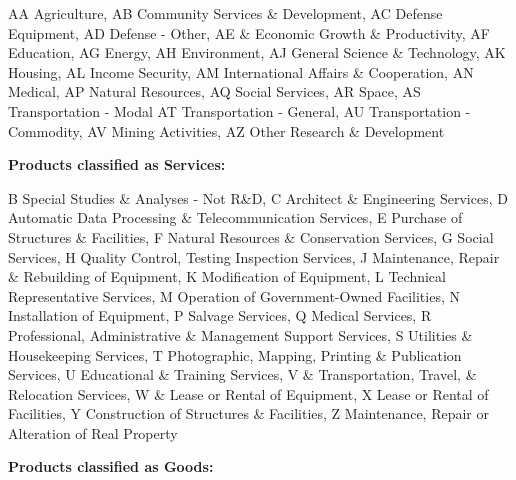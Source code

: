 \documentclass[dv_diss_main.tex]{subfiles}
\begin{document}
AA Agriculture, AB Community Services \& Development, AC Defense Equipment, AD Defense - Other, AE & Economic Growth \& Productivity, AF Education, AG Energy, AH Environment, AJ  General Science \& Technology, AK Housing, AL Income Security, AM International Affairs \& Cooperation,
AN Medical, AP Natural Resources, AQ Social Services, AR Space, AS Transportation - Modal AT Transportation - General, AU  Transportation - Commodity, AV  Mining Activities, AZ  Other Research \& Development

\bigskip
\newline
\vspace{4}
\noindent\textbf{Products classified as Services:}

B Special Studies \& Analyses - Not R\&D, C Architect \& Engineering Services, D  Automatic Data Processing \& Telecommunication Services, E  Purchase of Structures \& Facilities, F Natural Resources \& Conservation Services, G Social Services, H Quality Control, Testing Inspection Services, J Maintenance, Repair \& Rebuilding of Equipment, K Modification of Equipment, L Technical Representative Services, M Operation of Government-Owned Facilities, N Installation of Equipment, P Salvage Services, Q  Medical Services, R Professional, Administrative \& Management Support Services, S Utilities \& Housekeeping Services, T  Photographic, Mapping, Printing \& Publication Services, U  Educational \& Training Services, V & Transportation, Travel, \& Relocation Services, W \& Lease or Rental of Equipment, X  Lease or Rental of Facilities, Y  Construction of Structures \& Facilities, Z  Maintenance, Repair or Alteration of Real Property

\newline
\bigskip
\noindent\textbf{Products classified as Goods: }
\end{document}

